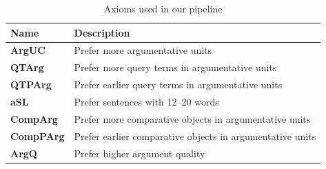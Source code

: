         \begin{table}
            \begin{tabular}{ll}
                \toprule
                Name & Description\\
                \midrule
                \textbf{ArgUC} & Prefer more argumentative units~\cite{bondarenko:2018}\\
                \textbf{QTArg} & Prefer more query terms in argumentative units~\cite{bondarenko:2018}\\
                \textbf{QTPArg} & Prefer earlier query terms in argumentative units~\cite{bondarenko:2018}\\
                \textbf{aSL} & Prefer sentences with 12–20 words~\cite{bondarenkoaxiomatic}\\
                \textbf{CompArg} & Prefer more comparative objects in argumentative units\\
                \textbf{CompPArg} & Prefer earlier comparative objects in argumentative units\\
                \textbf{ArgQ} & Prefer higher argument quality\\ 
                \bottomrule
            \end{tabular}
            \caption{Axioms used in our pipeline}
            \label{tab:axioms}
        \end{table}